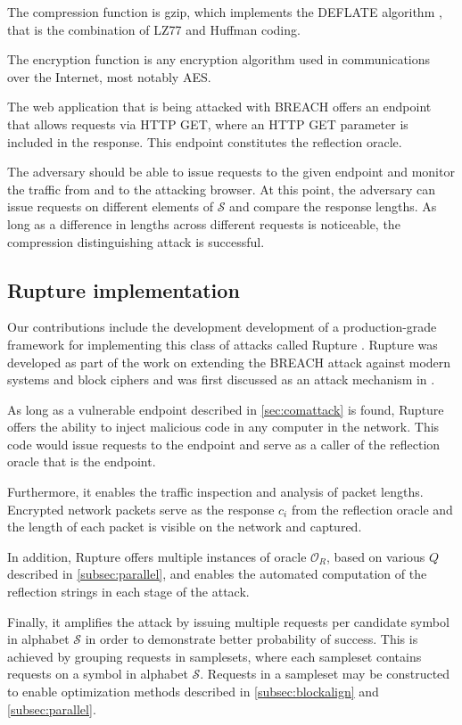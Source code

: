 \documentclass[conference, letterpaper, 10pt]{IEEEtran}
\begin{document}
The compression function is gzip, which implements the DEFLATE algorithm
\cite{c12}, that is the combination of LZ77 and Huffman coding.

The encryption function is any encryption algorithm used in communications over
the Internet, most notably AES.

The web application that is being attacked with BREACH offers an endpoint that
allows requests via HTTP GET, where an HTTP GET parameter is included in the
response. This endpoint constitutes the reflection oracle.

The adversary should be able to issue requests to the given endpoint and monitor
the traffic from and to the attacking browser. At this point, the adversary can
issue requests on different elements of $\mathcal{S}$ and compare the response lengths. As
long as a difference in lengths across different requests is noticeable, the
compression distinguishing attack is successful.

\subsection{Rupture implementation}\label{subsec:rupture}
Our contributions include the development development of a production-grade
framework for implementing this class of attacks called Rupture \cite{c13}.
Rupture was developed as part of the work on extending the BREACH attack against
modern systems and block ciphers and was first discussed as an attack mechanism
in \cite{c7}.

As long as a vulnerable endpoint described in \ref{sec:comattack} is found,
Rupture offers the ability to inject malicious code in any computer in the
network. This code would issue requests to the endpoint and serve as a caller of
the reflection oracle that is the endpoint.

Furthermore, it enables the traffic inspection and analysis of packet
lengths. Encrypted network packets serve as the response $c_i$ from the
reflection oracle and the length of each packet is visible on the network and
captured.

In addition, Rupture offers multiple instances of oracle $\mathcal{O}_R$, based
on various $Q$ described in \ref{subsec:parallel}, and enables the automated
computation of the reflection strings in each stage of the attack.

Finally, it amplifies the attack by issuing multiple requests per candidate
symbol in alphabet $\mathcal{S}$ in order to demonstrate better probability of
success. This is achieved by grouping requests in samplesets, where each
sampleset contains requests on a symbol in alphabet $\mathcal{S}$. Requests in a
sampleset may be constructed to enable optimization methods described in
\ref{subsec:blockalign} and \ref{subsec:parallel}.
\end{document}

